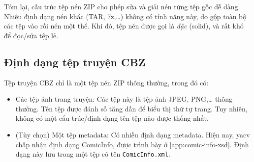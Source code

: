 \documentclass[../../thesis]{subfiles}
\begin{document}
Tóm lại, cấu trúc tệp nén ZIP cho phép sửa và giải nén từng tệp gốc dễ dàng.
Nhiều định dạng nén khác (TAR, 7z,\ldots) không có tính năng này, do gộp toàn bộ
các tệp vào rồi nén một thể. Khi đó, tệp nén được gọi là \emph{đặc} (solid), và
rất khó để đọc/sửa tệp lẻ.

\subsection{Định dạng tệp truyện CBZ}\label{sec:cbz}

Tệp truyện CBZ chỉ là một tệp nén ZIP thông thường, trong đó có:

\begin{itemize}
    \item
        Các tệp ảnh trang truyện: Các tệp này là tệp ảnh JPEG, PNG,\ldots{}
        thông thường. Tên tệp được đánh số tăng dần để biểu thị thứ tự trang.
        Tuy nhiên, không có một cấu trúc/định dạng tên tệp nào được thống nhất.
    \item
        (Tùy chọn) Một tệp metadata: Có nhiều định dạng metadata. Hiện nay, yacv
        chấp nhận định dạng ComicInfo, được trình bày ở
        \autoref{app:comic-info-xsd}. Định dạng này lưu trong một tệp có tên
        \texttt{ComicInfo.xml}.
\end{itemize}
\end{document}
